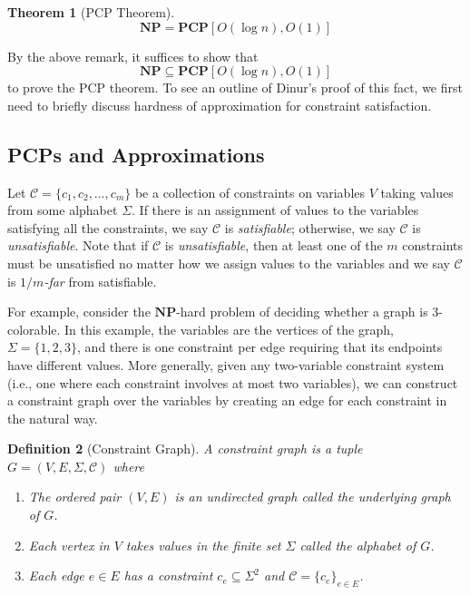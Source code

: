 \documentclass{article}
\newtheorem{theorem}{Theorem}
\newtheorem{definition}[theorem]{Definition}
\newcommand{\class}[1]{\mathbf{#1}}
\newcommand{\NP}{\class{NP}}
\newcommand{\PCP}{\class{PCP}}
\begin{document}
\begin{theorem}[PCP Theorem]
$$
\NP = \PCP[O(\log n), O(1)]
$$
\end{theorem}

By the above remark, it suffices to show that
$$
\NP \subseteq \PCP[O(\log n), O(1)]
$$
to prove the PCP theorem.
To see an outline of Dinur's proof of this fact, we first need to briefly
discuss hardness of approximation for constraint satisfaction.

\subsection{PCPs and Approximations}


Let $\mathcal{C} = \{c_1, c_2, \dots, c_m\}$ be a collection of constraints on
variables $V$ taking values from some alphabet $\Sigma$.
If there is an assignment of values to the variables satisfying all the
constraints, we say $\mathcal{C}$ is \emph{satisfiable}; otherwise, we say
$\mathcal{C}$ is \emph{unsatisfiable}.
Note that if $\mathcal{C}$ is \emph{unsatisfiable}, then at least one of the
$m$ constraints must be unsatisfied no matter how we assign values to the
variables and we say $\mathcal{C}$ is \emph{$1/m$-far} from satisfiable. 

For example, consider the $\NP$-hard problem of deciding whether a graph is 3-colorable.
In this example, the variables are the vertices of the graph, $\Sigma = \{1, 2,
3\}$, and there is one constraint per edge requiring that its endpoints have
different values.
More generally, given any two-variable constraint system (i.e., one where each
constraint involves at most two variables), we can construct a constraint graph
over the variables by creating an edge for each constraint in the natural way.



\begin{definition}[Constraint Graph] A constraint graph is a tuple
$G = (V, E, \Sigma, \mathcal{C})$ where
\begin{enumerate}
\item The ordered pair $(V, E)$ is an undirected graph called the underlying
  graph of $G$.
\item Each vertex in $V$ takes values in the finite set $\Sigma$
  called the alphabet of $G$.
\item Each edge $e \in E$ has a constraint $c_e \subseteq \Sigma^2$ and
  $\mathcal{C} = \{c_e\}_{e \in E}$.
\end{enumerate}
\end{definition}
\end{document}
